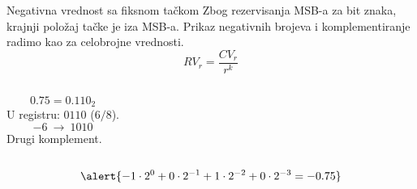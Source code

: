 \begin{frame}[label=04-s038]{Negativna vrednost sa fiksnom tačkom}
Zbog rezervisanja MSB-a za bit znaka, krajnji položaj tačke je iza MSB-a.
Prikaz negativnih brojeva i komplementiranje radimo kao za celobrojne vrednosti.
\[RV_r=\frac{CV_r}{r^k}\]
\begin{columns}[T,onlytextwidth]
\centering{}
\[0.75=0.110_2\]
U registru: $0110$ ($6/8$).
\centering{}
\[-6\ \longrightarrow\ 1010\]
Drugi komplement.
\end{columns}
\[\alert{-1\cdot2^0+0\cdot2^{-1}+1\cdot2^{-2}+0\cdot2^{-3}=-0.75}\]
\end{frame}
